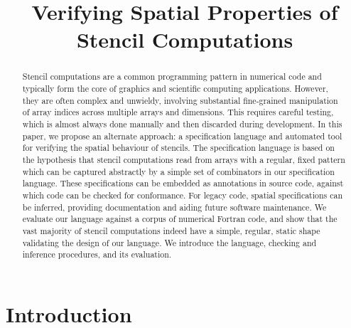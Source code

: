 \documentclass[10pt,preprint]{sigplanconf}
\title{Verifying Spatial Properties of Stencil Computations}
\theoremstyle{definition}
\begin{document}
\maketitle



\begin{abstract}
Stencil computations are a common programming pattern in numerical
  code and typically form the core of graphics and scientific
  computing applications. However, they are often complex and
  unwieldy, involving substantial fine-grained manipulation of array
  indices across multiple arrays and dimensions. This requires careful
  testing, which is almost always done manually and then discarded
  during development. In this paper, we propose an alternate approach:
  a specification language and automated tool for verifying the
  spatial behaviour of stencils. The specification language is based
  on the hypothesis that stencil computations read from arrays with a
  regular, fixed pattern which can be captured abstractly by a simple
  set of combinators in our specification language. These
  specifications can be embedded as annotations in source code,
  against which code can be checked for conformance. For legacy code,
  spatial specifications can be inferred, providing documentation and
  aiding future software maintenance. We evaluate our language against
  a corpus of numerical Fortran code, and show that the vast majority
  of stencil computations indeed have a simple, regular, static shape
  validating the design of our language.  We introduce the
  language, checking and inference procedures, and its evaluation.
\end{abstract}



\section{Introduction}\label{sec:intro}
\end{document}
